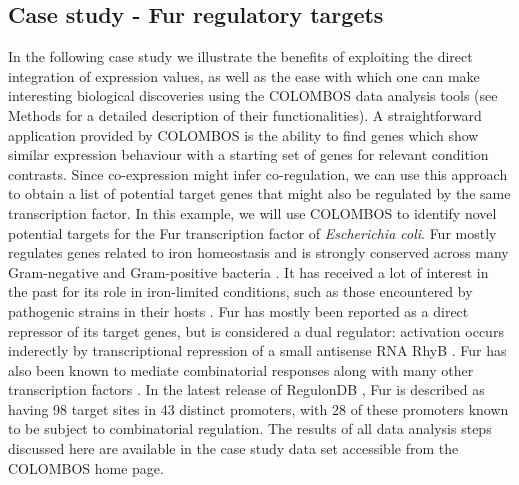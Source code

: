 \subsection{Case study - Fur regulatory targets}
In the following case study we illustrate the benefits of exploiting the direct integration of expression values, as well as the ease with which one can make interesting biological discoveries using the COLOMBOS data analysis tools (see Methods for a detailed description of their functionalities). A straightforward application provided by COLOMBOS is the ability to find genes which show similar expression behaviour with a starting set of genes for relevant condition contrasts. Since co-expression might infer co-regulation, we can use this approach to obtain a list of potential target genes that might also be regulated by the same transcription factor. In this example, we will use COLOMBOS to identify novel potential targets for the Fur transcription factor of {\it Escherichia coli}. Fur mostly regulates genes related to iron homeostasis and is strongly conserved across many Gram-negative and Gram-positive bacteria \cite{Chen2007}. It has received a lot of interest in the past for its role in iron-limited conditions, such as those encountered by pathogenic strains in their hosts \cite{Panina2001}. Fur has mostly been reported as a direct repressor of its target genes, but is considered a dual regulator: activation occurs inderectly by transcriptional repression of a small antisense RNA RhyB \cite{Masse2002}. Fur has also been known to mediate combinatorial responses along with many other transcription factors \cite{Patzer2001, Zhang2005}. In the latest release of RegulonDB \cite{Gama-Castro2008}, Fur is described as having 98 target sites in 43 distinct promoters, with 28 of these promoters known to be subject to combinatorial regulation. The results of all data analysis steps discussed here are available in the case study data set accessible from the COLOMBOS home page.

